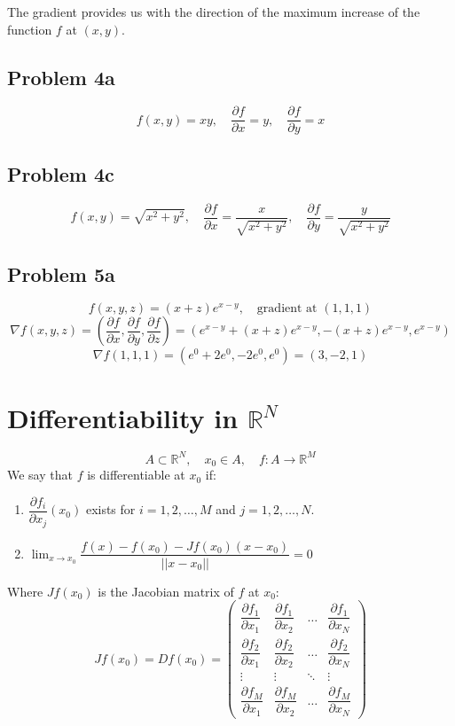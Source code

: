 \documentclass[11pt]{article}
\begin{document}
The gradient provides us with the direction of the maximum increase of the function $f$ at $(x,y)$.

\subsection*{Problem 4a}
\[
f(x,y) = xy, \quad \frac{\partial f}{\partial x} = y, \quad \frac{\partial f}{\partial y} = x
\]

\subsection*{Problem 4c}
\[
f(x,y) = \sqrt{x^2 + y^2}, \quad \frac{\partial f}{\partial x} = \frac{x}{\sqrt{x^2 + y^2}}, \quad \frac{\partial f}{\partial y} = \frac{y}{\sqrt{x^2 + y^2}}
\]

\subsection*{Problem 5a}
\[
f(x,y,z) = (x + z) e^{x - y}, \quad \text{gradient at } (1,1,1)
\]
\[
\nabla f(x,y,z) = \left(\frac{\partial f}{\partial x}, \frac{\partial f}{\partial y}, \frac{\partial f}{\partial z}\right) = \left(e^{x - y} + (x + z)e^{x - y}, -(x + z)e^{x - y}, e^{x - y}\right)
\]
\[
\nabla f(1,1,1) = (e^0 + 2e^0, -2e^0, e^0) = (3, -2, 1)
\]

\section{Differentiability in $\mathbb{R}^N$}
\[
A \subset \mathbb{R}^N, \quad x_0 \in A, \quad f : A \rightarrow \mathbb{R}^M
\] 
We say that $f$ is differentiable at $x_0$ if:
\begin{enumerate}
    \item $\dfrac{\partial f_i}{\partial x_j}(x_0)$ exists for $i = 1, 2, \ldots, M$ and $j = 1, 2, \ldots, N$.
    \item $\lim_{x \to x_0} \dfrac{f(x) - f(x_0) - Jf(x_0)(x - x_0)}{||x - x_0||} = 0$
\end{enumerate}
    
Where $Jf(x_0)$ is the Jacobian matrix of $f$ at $x_0$:
\[
Jf(x_0) = Df(x_0) =
\begin{pmatrix}
    \dfrac{\partial f_1}{\partial x_1} & \dfrac{\partial f_1}{\partial x_2} & \ldots & \dfrac{\partial f_1}{\partial x_N} \\
    \dfrac{\partial f_2}{\partial x_1} & \dfrac{\partial f_2}{\partial x_2} & \ldots & \dfrac{\partial f_2}{\partial x_N} \\
    \vdots & \vdots & \ddots & \vdots \\
    \dfrac{\partial f_M}{\partial x_1} & \dfrac{\partial f_M}{\partial x_2} & \ldots & \dfrac{\partial f_M}{\partial x_N}
\end{pmatrix}
\]
\end{document}
